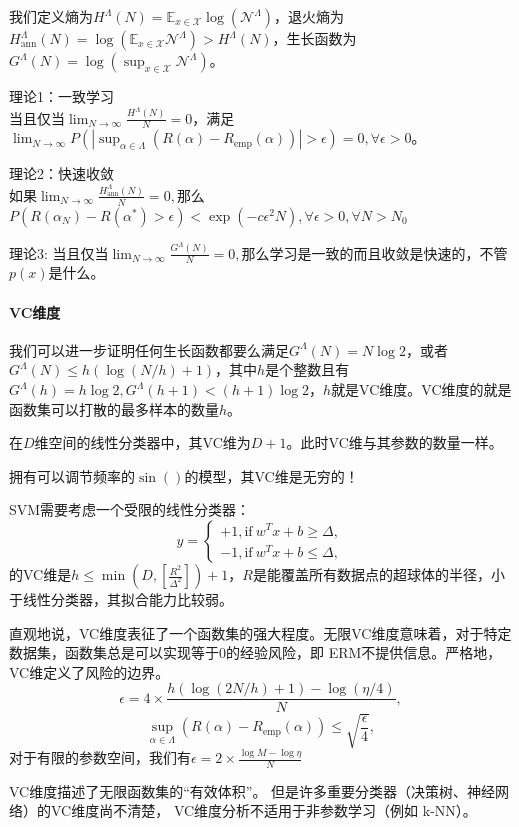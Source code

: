 我们定义熵为$H^\Lambda(N) = \mathbb{E}_{x\in \mathcal{X}} \log(\mathcal{N}^\Lambda)$，退火熵为$H_\mathrm{ann}^\Lambda(N) = \log(\mathbb{E}_{x\in \mathcal{X}} \mathcal{N}^\Lambda) > H^\Lambda(N)$，生长函数为$G^\Lambda(N) = \log(\sup_{x\in \mathcal{X}} \mathcal{N}^\Lambda)$。

理论1：一致学习\\
当且仅当$\lim_{N\to \infty} \frac{H^\Lambda(N)}{N} = 0$，满足$\lim_{N\to \infty} P(|\sup_{\alpha \in \Lambda}(R(\alpha) - R_\text{emp}(\alpha))| > \epsilon) = 0, \forall \epsilon > 0$。

理论2：快速收敛\\
如果$\lim_{N\to \infty} \frac{H_\mathrm{ann}^\Lambda(N)}{N} = 0,$那么$P(R(\alpha_N) - R(\alpha^*) > \epsilon) < \exp(-c\epsilon^2N), \forall \epsilon > 0, \forall N > N_0$

理论3:
当且仅当$\lim_{N\to \infty} \frac{G^\Lambda(N)}{N} = 0,$那么学习是一致的而且收敛是快速的，不管$p(x)$是什么。

\paragraph{VC维度}
我们可以进一步证明任何生长函数都要么满足$G^\Lambda(N) = N\log 2$，或者$G^\Lambda(N) \le h(\log (N/h) + 1)$，其中$h$是个整数且有$G^\Lambda(h) = h \log 2, G^\Lambda(h+1) < (h+1)\log 2$，$h$就是VC维度。VC维度的就是函数集可以打散的最多样本的数量$h$。

在$D$维空间的线性分类器中，其VC维为$D+1$。此时VC维与其参数的数量一样。

拥有可以调节频率的$\sin()$的模型，其VC维是无穷的！

SVM需要考虑一个受限的线性分类器：$$y=\left\{\begin{aligned} 
+1, \text{if}\ w^Tx+b\ge \Delta, \\
-1, \text{if}\ w^Tx+b\le \Delta,
\end{aligned}\right.$$的VC维是$h \le \min(D, [\frac{R^2}{\Delta^2}]) + 1$，$R$是能覆盖所有数据点的超球体的半径，小于线性分类器，其拟合能力比较弱。

直观地说，VC维度表征了一个函数集的强大程度。无限VC维度意味着，对于特定数据集，函数集总是可以实现等于0的经验风险，即 ERM不提供信息。严格地，VC维定义了风险的边界。
$$
\epsilon = 4\times \frac{h(\log(2N/h)+1) - \log(\eta/4)}{N},
$$
$$
\sup_{\alpha \in \Lambda}(R(\alpha) - R_\text{emp}(\alpha)) \le \sqrt{\frac{\epsilon}{4}},
$$
对于有限的参数空间，我们有$\epsilon = 2 \times \frac{\log M - \log \eta}{N}$

VC维度描述了无限函数集的“有效体积”。
但是许多重要分类器（决策树、神经网络）的VC维度尚不清楚，
VC维度分析不适用于非参数学习（例如 k-NN）。


